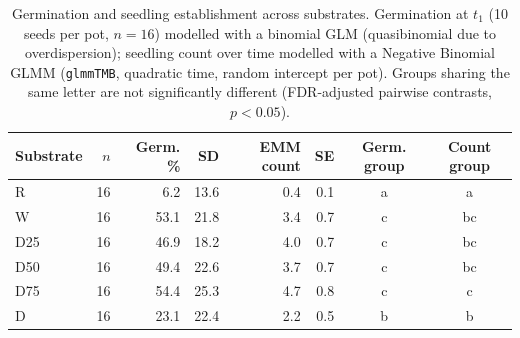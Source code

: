 \begin{table}[htbp]
\centering
\caption{Germination and seedling establishment across substrates. Germination at $t_1$ (10 seeds per pot, $n=16$) modelled with a binomial GLM (quasibinomial due to overdispersion); seedling count over time modelled with a Negative Binomial GLMM (\texttt{glmmTMB}, quadratic time, random intercept per pot). Groups sharing the same letter are not significantly different (FDR-adjusted pairwise contrasts, $p < 0.05$).}
\label{tab:germination_stats}
\small
\begin{tabular}{l r rr rr cc}
\toprule
Substrate & $n$ & Germ. \% & SD & EMM count & SE & Germ. group & Count group \\
\midrule
R      & 16 & 6.2 & 13.6 & 0.4 & 0.1 & a & a \\
W      & 16 & 53.1 & 21.8 & 3.4 & 0.7 & c & bc \\
D25    & 16 & 46.9 & 18.2 & 4.0 & 0.7 & c & bc \\
D50    & 16 & 49.4 & 22.6 & 3.7 & 0.7 & c & bc \\
D75    & 16 & 54.4 & 25.3 & 4.7 & 0.8 & c & c \\
D      & 16 & 23.1 & 22.4 & 2.2 & 0.5 & b & b \\
\bottomrule
\end{tabular}
\end{table}
